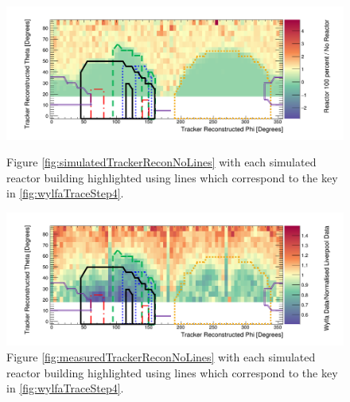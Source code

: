 \begin{figure}
  \centering
    \includegraphics[width=0.875\linewidth]{Chapter5/Figs/wylfaRasterNew/simulatedTrackerRecon.png}
    \caption{Figure \ref{fig:simulatedTrackerReconNoLines} with each simulated reactor building highlighted using lines which correspond to the key in \ref{fig:wylfaTraceStep4}.}
  \label{fig:simulatedTrackerRecon}
    \includegraphics[width=0.875\linewidth]{Chapter5/Figs/wylfaRasterNew/measuredTrackerRecon.png}
    \caption{Figure \ref{fig:measuredTrackerReconNoLines} with each simulated reactor building highlighted using lines which correspond to the key in \ref{fig:wylfaTraceStep4}.}
  \label{fig:measuredTrackerRecon}
\end{figure}




